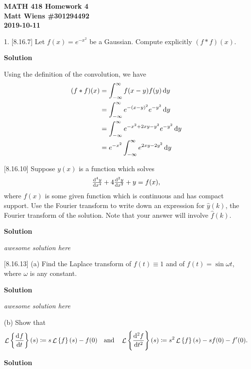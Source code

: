 \documentclass{article}
\DeclareMathOperator{\Lagr}{\mathcal{L}}
\begin{document}
\textbf{MATH 418 Homework 4} \\
\textbf{Matt Wiens \#301294492} \\
\textbf{2019-10-11}

1. [8.16.7] Let $f(x) = e^{-x^2}$ be a Gaussian. Compute explicitly $(f * f)(x)$.

\textbf{Solution}

Using the definition of the convolution, we have
%
\begin{align*}
    (f * f)(x)
        &= \int_{- \infty}^{\infty} f(x - y) f(y) \dif y \\
        &= \int_{- \infty}^{\infty} e^{-(x - y)^2} e^{-y^2} \dif y \\
        &= \int_{- \infty}^{\infty} e^{-x^2 + 2 x y - y^2} e^{-y^2} \dif y \\
        &= e^{-x^2} \int_{- \infty}^{\infty} e^{2 x y - 2 y^2} \dif y
\end{align*}

\vspace{5mm}

[8.16.10] Suppose $y(x)$ is a function which solves
%
\begin{equation*}
    \od[4]{y}{x} + 4 \od[2]{y}{x} + y = f(x)
    ,
\end{equation*}
%
where $f(x)$ is some given function which is continuous and has compact
support. Use the Fourier transform to write down an expression for
$\widehat{y}(k)$, the Fourier transform of the solution. Note that your
answer will involve $\widehat{f}(k)$.

\textbf{Solution}

\textit{awesome solution here}

\vspace{5mm}

[8.16.13] (a) Find the Laplace transform of $f(t) \equiv 1$ and of
$f(t) = \sin \omega t$, where $\omega$ is any constant.

\textbf{Solution}

\textit{awesome solution here}

\vspace{5mm}

(b) Show that
%
\begin{equation*}
    \Lagr \cbr{\dod{f}{t}}(s) \coloneqq s \Lagr \cbr{f}(s) - f(0)
    \quad \text{and} \quad
    \Lagr \cbr{\dod[2]{f}{t}}(s) \coloneqq s^2 \Lagr \cbr{f}(s) - s f(0) - f^\prime(0)
    .
\end{equation*}

\textbf{Solution}
\end{document}
